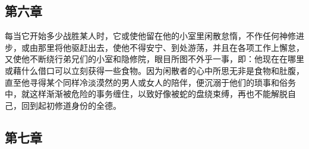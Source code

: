 
\subsection{第六章}

\par

每当它开始多少战胜某人时，它或使他留在他的小室里闲散怠惰，不作任何神修进步，或由那里将他驱赶出去，使他不得安宁、到处游荡，并且在各项工作上懈怠，又使他不断绕行弟兄们的小室和隐修院，眼目所图不外乎一事，即：他现在在哪里或藉什么借口可以立刻获得一些食物。因为闲散者的心中所思无非是食物和肚腹，直至他寻得某个同样冷淡漠然的男人或女人的陪伴，便沉溺于他们的琐事和俗务中，就这样渐渐被危险的事务缠住，以致好像被蛇的盘绕束缚，再也不能解脱自己，回到起初修道身份的全德。\par


\subsection{第七章}

\par

